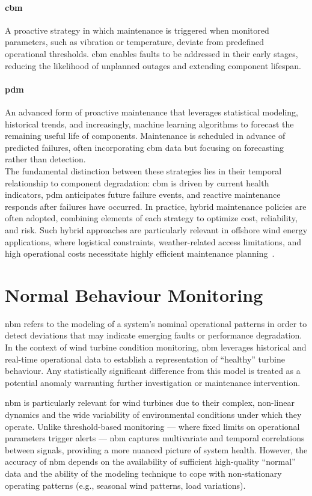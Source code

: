 \paragraph{\gls{cbm}}
A proactive strategy in which maintenance is triggered when monitored parameters, such as vibration or temperature, deviate from predefined operational thresholds.
\gls{cbm} enables faults to be addressed in their early stages, reducing the likelihood of unplanned outages and extending component lifespan.
\paragraph{\gls{pdm}}
An advanced form of proactive maintenance that leverages statistical modeling, historical trends, and increasingly, machine learning algorithms to forecast the remaining useful life of components.
Maintenance is scheduled in advance of predicted failures, often incorporating \gls{cbm} data but focusing on forecasting rather than detection.\\

The fundamental distinction between these strategies lies in their temporal relationship to component degradation: \gls{cbm} is driven by current health indicators, \gls{pdm} anticipates future failure events, and reactive maintenance responds after failures have occurred.
In practice, hybrid maintenance policies are often adopted, combining elements of each strategy to optimize cost, reliability, and risk.
Such hybrid approaches are particularly relevant in offshore wind energy applications, where logistical constraints, weather-related access limitations, and high operational costs necessitate highly efficient maintenance planning~\citep{yang_operations_2021}.


\section{Normal Behaviour Monitoring}
\label{sec:normal-behaviour-monitoring}
\gls{nbm} refers to the modeling of a system's nominal operational patterns in order to detect deviations that may indicate emerging faults or performance degradation.
In the context of wind turbine condition monitoring, \gls{nbm} leverages historical and real-time operational data to establish a representation of “healthy” turbine behaviour.
Any statistically significant difference from this model is treated as a potential anomaly warranting further investigation or maintenance intervention.

\gls{nbm} is particularly relevant for wind turbines due to their complex, non-linear dynamics and the wide variability of environmental conditions under which they operate.
Unlike threshold-based monitoring — where fixed limits on operational parameters trigger alerts — \gls{nbm} captures multivariate and temporal correlations between signals, providing a more nuanced picture of system health.
However, the accuracy of \gls{nbm} depends on the availability of sufficient high-quality “normal” data and the ability of the modeling technique to cope with non-stationary operating patterns (e.g., seasonal wind patterns, load variations).

